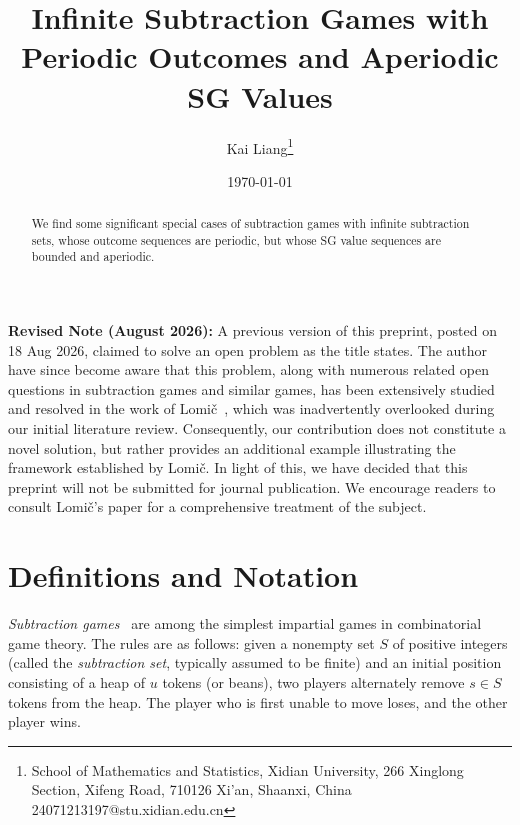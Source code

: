 \documentclass[11pt]{article}
\theoremstyle{definition}
\theoremstyle{plain}
\begin{document}
\title{Infinite Subtraction Games with Periodic Outcomes and Aperiodic SG Values}

\author{Kai Liang\thanks{School of Mathematics and Statistics, Xidian University, 266 Xinglong Section, Xifeng Road, 710126 Xi'an, Shaanxi, China \\ 24071213197@stu.xidian.edu.cn}}
\date{\today}
\maketitle

\noindent\textbf{Revised Note (August 2026):}
A previous version of this preprint, posted on 18 Aug 2026, claimed to solve an open problem as the title states.
The author have since become aware that this problem, along with numerous related open questions in subtraction games and similar games, has been extensively studied and resolved in the work of Lomi{\v{c}}~\cite{Lomic2019}, which was inadvertently overlooked during our initial literature review.
Consequently, our contribution does not constitute a novel solution, but rather provides an additional example illustrating the framework established by Lomi{\v{c}}.
In light of this, we have decided that this preprint will not be submitted for journal publication.
We encourage readers to consult Lomi{\v{c}}'s paper for a comprehensive treatment of the subject.

\begin{abstract}
     We find some significant special cases of subtraction games with infinite subtraction sets, whose outcome sequences are periodic, but whose SG value sequences are bounded and aperiodic.
\end{abstract}

\section{Definitions and Notation}

\textit{Subtraction games}~\cite{SubGame1966} are among the simplest impartial games in combinatorial game theory.
The rules are as follows: given a nonempty set $S$ of positive integers (called the \textit{subtraction set}, typically assumed to be finite) and an initial position consisting of a heap of $u$ tokens (or beans), two players alternately remove $s \in S$ tokens from the heap.
The player who is first unable to move loses, and the other player wins.
\end{document}

